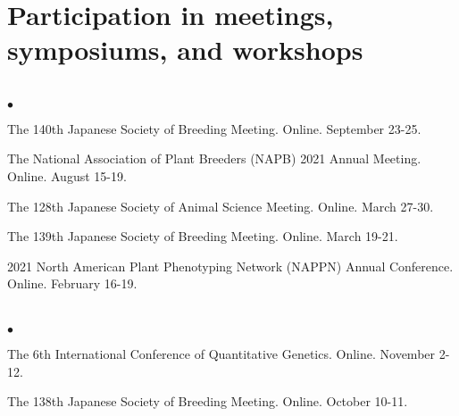 \documentclass[margin,line,10pt]{res}
\newenvironment{list2}{
  \begin{list}{$\bullet$}{%
      \setlength{\itemsep}{0in}
      \setlength{\parsep}{0in} \setlength{\parskip}{0in}
      \setlength{\topsep}{0in} \setlength{\partopsep}{0in} 
      \setlength{\leftmargin}{0.2in}}}{\end{list}}
\begin{document}
\begin{resume}
\vspace{0.5cm}
\section{\sc Participation in meetings, symposiums, and workshops} 
\vspace{2cm}


\section{}
\begin{list2}

 
  
\item The 140th Japanese Society of Breeding Meeting. Online. September 23-25.  

   \vspace{0.5cm}

   \item  The National Association of Plant Breeders (NAPB) 2021 Annual Meeting. Online. August 15-19.
  
     \vspace{0.5cm}

\item  The 128th Japanese Society of Animal Science Meeting. Online. March 27-30.
  
  \vspace{0.5cm}
  
\item The 139th Japanese Society of Breeding Meeting. Online. March 19-21.  

    \vspace{0.5cm}

  \item 2021 North American Plant Phenotyping Network (NAPPN) Annual Conference. Online. February 16-19.  
  
\end{list2}

  
\section{}
\begin{list2}


\item  The 6th International Conference of Quantitative Genetics. Online. November 2-12. 

  \vspace{0.5cm}

  
  \item The 138th Japanese Society of Breeding Meeting. Online. October 10-11.  


\end{list2}
\end{resume}
\end{document}
